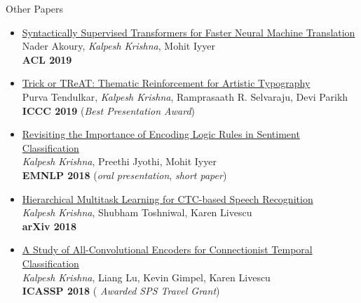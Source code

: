 \documentclass{resume} %
\begin{document}
\begin{rSection}{Other Papers}
\begin{itemize}[leftmargin=*]
\item \href{https://arxiv.org/abs/1906.02780}{Syntactically Supervised Transformers for Faster Neural Machine Translation} \\ Nader Akoury, \textit{Kalpesh Krishna}, Mohit Iyyer \\ \textbf{ACL 2019}
\item \href{https://arxiv.org/abs/1903.07820}{Trick or TReAT: Thematic Reinforcement for Artistic Typography} \\ Purva Tendulkar, \textit{Kalpesh Krishna}, Ramprasaath R. Selvaraju, Devi Parikh \\ \textbf{ICCC 2019} ({\textit{Best Presentation Award}})
\item \href{https://arxiv.org/abs/1808.07733}{Revisiting the Importance of Encoding Logic Rules in Sentiment Classification} \\ \textit{Kalpesh Krishna}, Preethi Jyothi, Mohit Iyyer \\ \textbf{EMNLP 2018} ({\textit{oral presentation}}, \textit{short paper})
\item \href{https://arxiv.org/abs/1807.06234}{Hierarchical Multitask Learning for CTC-based Speech Recognition} \\ \textit{Kalpesh Krishna}, Shubham Toshniwal, Karen Livescu \\
\textbf{arXiv 2018}
\item \href{https://arxiv.org/abs/1710.10398}{A Study of All-Convolutional Encoders for Connectionist Temporal Classification}\\ \textit{Kalpesh Krishna}, Liang Lu, Kevin Gimpel,  Karen Livescu\\ \textbf{ICASSP 2018} ({ \textit{Awarded SPS Travel Grant}})
%
\end{itemize}
\end{rSection}


\end{document}
